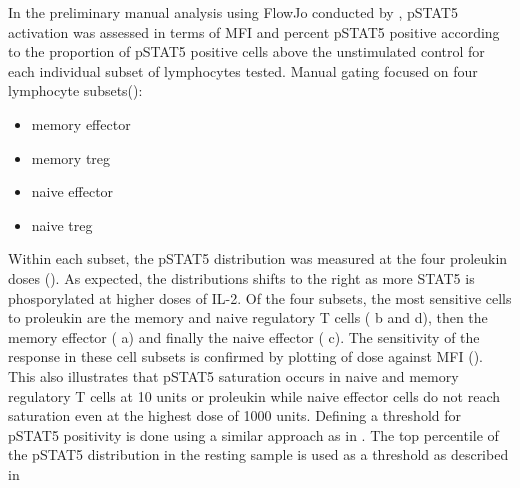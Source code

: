 In the preliminary manual analysis using FlowJo conducted by , pSTAT5 activation was assessed in terms of MFI and percent pSTAT5 positive according
to the proportion of pSTAT5 positive cells above the unstimulated control for each individual subset of lymphocytes tested.  
Manual gating focused on four lymphocyte subsets():
\begin{itemize}
  \item memory effector
  \item memory treg
  \item naive effector
  \item naive treg
\end{itemize}
Within each subset, the pSTAT5 distribution was measured at the four proleukin doses ().
As expected, the distributions shifts to the right as more STAT5 is phosporylated at higher doses of IL-2.
Of the four subsets, the most sensitive cells to proleukin are the memory and naive regulatory T cells ( b and d),
then the memory effector ( a) and finally the naive effector ( c).
The sensitivity of the response in these cell subsets is confirmed by plotting of dose against MFI ().
This also illustrates that pSTAT5 saturation occurs in naive and memory regulatory T cells at 10 units or proleukin while naive effector cells do not reach
saturation even at the highest dose of 1000 units.
Defining a threshold for pSTAT5 positivity is done using a similar approach as in .
The top percentile of the pSTAT5 distribution in the resting sample is used as a threshold as described in %
 


%

